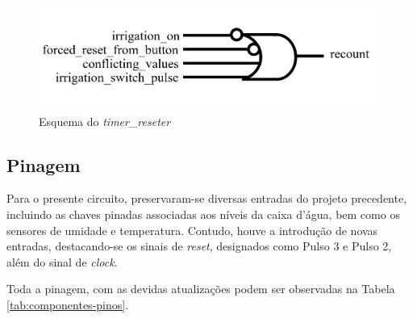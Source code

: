 \documentclass[
	article,			%
	11pt,				%
	oneside,			%
	a4paper,			%
	english,			%
	brazil,				%
	sumario=tradicional
	]{abntex2}
\begin{document}
\begin{figure} [H]
    \centering
    \includegraphics[width=0.5\linewidth]{reseter.png}
    \caption{Esquema do \textit{timer\_reseter}}
    \label{fig:timer_reseter}
\end{figure}



\subsection{Pinagem}

Para o presente circuito, preservaram-se diversas entradas do projeto precedente, incluindo as chaves pinadas associadas aos níveis da caixa d'água, bem como os sensores de umidade e temperatura. Contudo, houve a introdução de novas entradas, destacando-se os sinais de \textit{reset}, designados como Pulso 3 e Pulso 2, além do sinal de \textit{clock}.

Toda a pinagem, com as devidas atualizações podem ser observadas na Tabela \ref{tab:componentes-pinos}.
\end{document}
